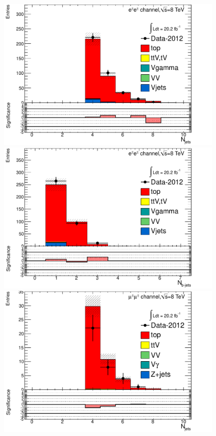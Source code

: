  \begin{figure}[htbp]

  \begin{minipage}[h]{0.5\textwidth}
    \centering \includegraphics[width=\textwidth]{figs/fake/TaT-5jets-1b_nj_ee}
  \end{minipage}\hfill
  \begin{minipage}[h]{0.5\textwidth}
    \centering \includegraphics[width=\textwidth]{figs/fake/TaT-5jets-1b_nb_ee}
  \end{minipage}\hfill
  \begin{minipage}[h]{0.5\textwidth}
    \centering \includegraphics[width=\textwidth]{figs/fake/TaT-5jets-1b_nj_mm}

\end{minipage}
\end{figure}
